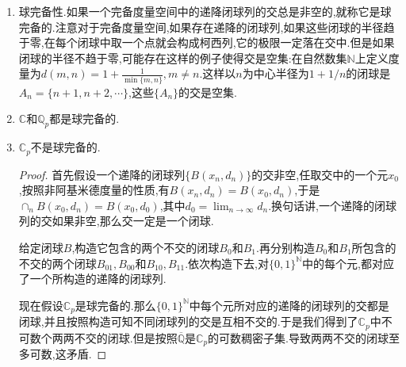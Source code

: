 \begin{enumerate}
\begin{proof}
		记$C'$为$\mathbb{C}_p$关于$f$的分裂域.记$r=\max\limits_{i\not=j}\{v(a_i-a_j)\}$,这里$\{a_i\}$是$f$的全部不同根.按照$\mathbb{C}_p$的完备性,可取$b_i\in\overline{\mathbb{Q}_p}$使得$v(b_i-a_i)>rn$.取$g=\sum_ib_ix^i\in\overline{\mathbb{Q}_p}$,按照$\overline{\mathbb{Q}_p}$是代数闭域,可取$g$的一个根$\beta$.取$f$的根$\alpha$是所有根中离$\beta$最近的根,也即$|\beta-\alpha|\le|\beta-\alpha'|$对任意$f$的根$\alpha'$成立.我们来证明$\alpha\in\mathbb{C}_p[\beta]$,于是有$\alpha\in\mathbb{C}_p$,于是$\mathbb{C}_p$是代数闭域.
		
		按照$f(\beta)-g(\beta)=f(\beta)=\prod_i(\beta-\alpha_i)$,于是$v(f(\beta)-g(\beta))=\sum_iv(\beta-\alpha_i)\le nv(\beta-\alpha)$.但是另一方面$f(\beta)-g(\beta)$的系数满足$v(b_i-a_i)>rn$,导致$v(f(\beta)-g(\beta))\ge rn$.于是整理下不等式得到$v(\beta-\alpha)>r$.也即$v(\beta-\alpha)\ge v(\alpha_i-\alpha_j),i\not=j$.于是$|\beta-\alpha|<|\alpha_i-\alpha|,\forall\alpha_i\not=\alpha$.
	\end{proof}
	\item 球完备性.如果一个完备度量空间中的递降闭球列的交总是非空的,就称它是球完备的.注意对于完备度量空间,如果存在递降的闭球列,如果这些闭球的半径趋于零,在每个闭球中取一个点就会构成柯西列,它的极限一定落在交中.但是如果闭球的半径不趋于零,可能存在这样的例子使得交是空集:在自然数集$\mathbb{N}$上定义度量为$d(m,n)=1+\frac{1}{\min\{m,n\}},m\not=n$.这样以$n$为中心半径为$1+1/n$的闭球是$A_n=\{n+1,n+2,\cdots\}$,这些$\{A_n\}$的交是空集.
	\item $\mathbb{C}$和$\mathbb{Q}_p$都是球完备的.
	\item $\mathbb{C}_p$不是球完备的.
	\begin{proof}
		
		首先假设一个递降的闭球列$\{B(x_n,d_n)\}$的交非空,任取交中的一个元$x_0$,按照非阿基米德度量的性质,有$B(x_n,d_n)=B(x_0,d_n)$,于是$\cap_nB(x_0,d_n)=B(x_0,d_0)$,其中$d_0=\lim_{n\to\infty}d_n$.换句话讲,一个递降的闭球列的交如果非空,那么交一定是一个闭球.
		
		给定闭球$B$,构造它包含的两个不交的闭球$B_{0}$和$B_1$.再分别构造$B_0$和$B_1$所包含的不交的两个闭球$B_{01},B_{00}$和$B_{10},B_{11}$.依次构造下去,对$\{0,1\}^{\mathbb{N}}$中的每个元,都对应了一个所构造的递降的闭球列.
		
		现在假设$\mathbb{C}_p$是球完备的.那么$\{0,1\}^{\mathbb{N}}$中每个元所对应的递降的闭球列的交都是闭球,并且按照构造可知不同闭球列的交是互相不交的.于是我们得到了$\mathbb{C}_p$中不可数个两两不交的闭球.但是按照$\overline{\mathbb{Q}}$是$\mathbb{C}_p$的可数稠密子集.导致两两不交的闭球至多可数,这矛盾.
	\end{proof}
\end{enumerate}
\newpage
